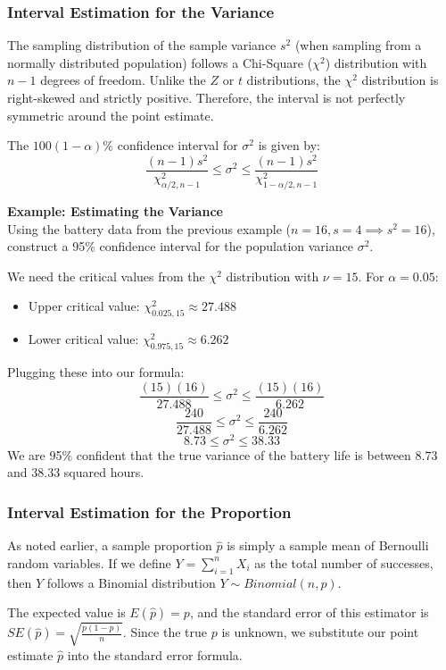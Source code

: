 \documentclass{article}
\begin{document}
\subsubsection{Interval Estimation for the Variance}

The sampling distribution of the sample variance $s^2$ (when sampling from a normally distributed population) follows a Chi-Square ($\chi^2$) distribution with $n-1$ degrees of freedom. Unlike the $Z$ or $t$ distributions, the $\chi^2$ distribution is right-skewed and strictly positive. Therefore, the interval is not perfectly symmetric around the point estimate.

The $100(1-\alpha)$\% confidence interval for $\sigma^2$ is given by:
$$\frac{(n-1)s^2}{\chi^2_{\alpha/2, n-1}} \leq \sigma^2 \leq \frac{(n-1)s^2}{\chi^2_{1-\alpha/2, n-1}}$$

\textbf{Example: Estimating the Variance} \\
Using the battery data from the previous example ($n=16, s=4 \implies s^2=16$), construct a 95\% confidence interval for the population variance $\sigma^2$. 

We need the critical values from the $\chi^2$ distribution with $\nu=15$. For $\alpha=0.05$:
\begin{itemize}
    \item Upper critical value: $\chi^2_{0.025, 15} \approx 27.488$
    \item Lower critical value: $\chi^2_{0.975, 15} \approx 6.262$
\end{itemize}
Plugging these into our formula:
$$\frac{(15)(16)}{27.488} \leq \sigma^2 \leq \frac{(15)(16)}{6.262}$$
$$\frac{240}{27.488} \leq \sigma^2 \leq \frac{240}{6.262}$$
$$8.73 \leq \sigma^2 \leq 38.33$$
We are 95\% confident that the true variance of the battery life is between $8.73$ and $38.33$ squared hours.

\subsubsection{Interval Estimation for the Proportion}

As noted earlier, a sample proportion $\hat{p}$ is simply a sample mean of Bernoulli random variables. If we define $Y = \sum_{i=1}^{n}X_i$ as the total number of successes, then $Y$ follows a Binomial distribution $Y \sim Binomial(n,p)$. 

The expected value is $E(\hat{p}) = p$, and the standard error of this estimator is $SE(\hat{p}) = \sqrt{\frac{p(1-p)}{n}}$. Since the true $p$ is unknown, we substitute our point estimate $\hat{p}$ into the standard error formula. 
\end{document}
